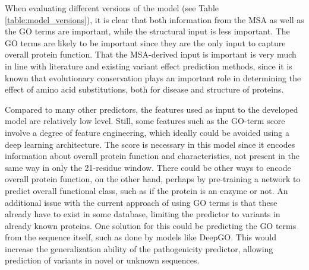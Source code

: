 \documentclass[11pt]{article}
\begin{document}
When evaluating different versions of the model (see Table \ref{table:model_versions}), it is clear that both information from the MSA as well as the GO terms are important, while the structural input is less important. The GO terms are likely to be important since they are the only input to capture overall protein function. That the MSA-derived input is important is very much in line with literature and existing variant effect prediction methods, since it is known that evolutionary conservation plays an important role in determining the effect of amino acid substitutions, both for disease and structure of proteins.

Compared to many other predictors, the features used as input to the developed model are relatively low level. Still, some features such as the GO-term score involve a degree of feature engineering, which ideally could be avoided using a deep learning architecture. The score is necessary in this model since it encodes information about overall protein function and characteristics, not present in the same way in only the 21-residue window. There could be other ways to encode overall protein function, on the other hand, perhaps by pre-training a network to predict overall functional class, such as if the protein is an enzyme or not. An additional issue with the current approach of using GO terms is that these already have to exist in some database, limiting the predictor to variants in already known proteins. One solution for this could be predicting the GO terms from the sequence itself, such as done by models like DeepGO\cite{kulmanov2017deepgo}. This would increase the generalization ability of the pathogenicity predictor, allowing prediction of variants in novel or unknown sequences.


\clearpage

\begin{appendices}



\clearpage



\end{appendices}

\newpage
\mbox{}
\newpage


\end{document}
